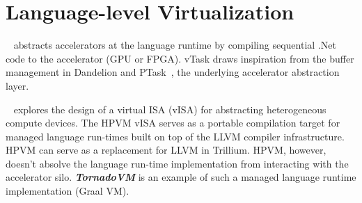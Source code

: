 \section{Language-level Virtualization}
~\cite{dandelion} abstracts accelerators at the
language runtime by compiling sequential .Net code to the accelerator
(GPU or FPGA). vTask draws inspiration from the buffer management in Dandelion
and PTask~\cite{rossbach2011ptask}, the underlying accelerator abstraction
layer.

~\cite{HPVM} explores the design of a virtual ISA
(vISA) for abstracting heterogeneous compute devices. The HPVM vISA serves as
a portable compilation target for managed language run-times built on top of
the LLVM compiler infrastructure. HPVM can serve as a replacement for LLVM in
Trillium. HPVM, however, doesn't absolve the language run-time implementation
from interacting with the accelerator silo. \textbf{\textit{TornadoVM}} is an
example of such a managed language runtime implementation (Graal VM).